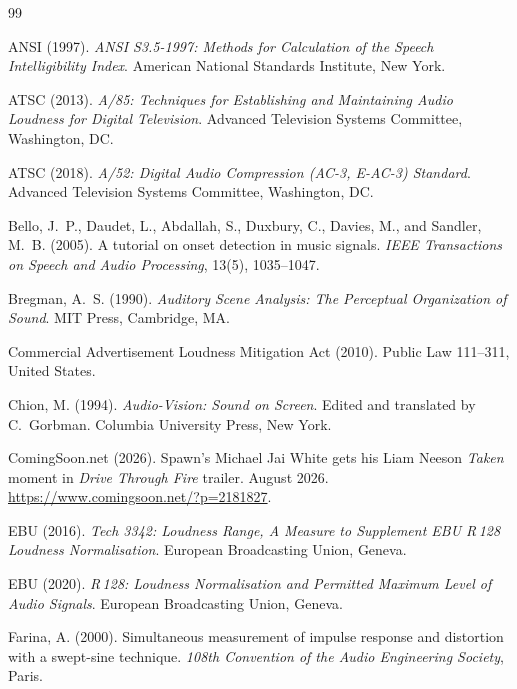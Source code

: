 \begin{thebibliography}{99}

ANSI (1997). \emph{ANSI S3.5-1997: Methods for Calculation of the Speech Intelligibility Index}. American National Standards Institute, New York.

ATSC (2013). \emph{A/85: Techniques for Establishing and Maintaining Audio Loudness for Digital Television}. Advanced Television Systems Committee, Washington, DC.

ATSC (2018). \emph{A/52: Digital Audio Compression (AC-3, E-AC-3) Standard}. Advanced Television Systems Committee, Washington, DC.

Bello, J.~P., Daudet, L., Abdallah, S., Duxbury, C., Davies, M., and Sandler, M.~B. (2005). A tutorial on onset detection in music signals. \emph{IEEE Transactions on Speech and Audio Processing}, 13(5), 1035--1047.

Bregman, A.~S. (1990). \emph{Auditory Scene Analysis: The Perceptual Organization of Sound}. MIT Press, Cambridge, MA.

Commercial Advertisement Loudness Mitigation Act (2010). Public Law 111--311, United States.

Chion, M. (1994). \emph{Audio-Vision: Sound on Screen}. Edited and translated by C.~Gorbman. Columbia University Press, New York.

ComingSoon.net (2026). Spawn's Michael Jai White gets his Liam Neeson \emph{Taken} moment in \emph{Drive Through Fire} trailer. August 2026. \url{https://www.comingsoon.net/?p=2181827}.

EBU (2016). \emph{Tech 3342: Loudness Range, A Measure to Supplement EBU R\,128 Loudness Normalisation}. European Broadcasting Union, Geneva.

EBU (2020). \emph{R\,128: Loudness Normalisation and Permitted Maximum Level of Audio Signals}. European Broadcasting Union, Geneva.

Farina, A. (2000). Simultaneous measurement of impulse response and distortion with a swept-sine technique. \emph{108th Convention of the Audio Engineering Society}, Paris.


\end{thebibliography}
